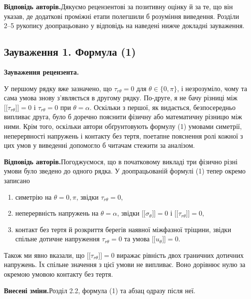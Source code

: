 \documentclass[11pt]{article}
\newcommand{\llbracket}{\mathopen{[\![}}
\newcommand{\rrbracket}{\mathclose{]\!]}}
\newcommand{\responseheading}{\textbf{Відповідь авторів.}\enspace}
\newcommand{\revisionheading}{\textbf{Внесені зміни.}\enspace}
\newenvironment{reviewcomment}{\def\FrameCommand{\textcolor{blue!45!black}{\vrule width 1.2pt}\hspace{9pt}}\MakeFramed{\advance\hsize-\width\FrameRestore}\noindent\textbf{Зауваження рецензента.}\par\smallskip\noindent}{\endMakeFramed}
\begin{document}
\responseheading Дякуємо рецензентові за позитивну оцінку й за те, що він указав, де додаткові проміжні етапи полегшили б розуміння виведення. Розділи 2–5 рукопису доопрацьовано у відповідь на наведені нижче докладні зауваження.

\subsection*{Зауваження 1. Формула (1)}

\begin{reviewcomment}
У першому рядку вже зазначено, що \(\tau_{r\theta}=0\) для \(\theta\in\{0,\pi\}\), і незрозуміло, чому та сама умова знову з’являється в другому рядку. По-друге, я не бачу різниці між \(\llbracket\tau_{r\theta}\rrbracket=0\) і \(\tau_{r\theta}=0\) при \(\theta=\alpha\). Оскільки з першої, як видається, безпосередньо випливає друга, було б доречно пояснити фізичну або математичну різницю між ними. Крім того, оскільки автори обґрунтовують формулу (1) умовами симетрії, неперервності напружень і контакту без тертя, поетапне пояснення ролі кожної з цих умов у виведенні допомогло б читачам стежити за аналізом.
\end{reviewcomment}

\responseheading Погоджуємося, що в початковому викладі три фізично різні умови було зведено до одного рядка. У доопрацьованій формулі (1) тепер окремо записано

\begin{enumerate}
\item симетрію на \(\theta=0,\pi\), звідки \(\tau_{r\theta}=0\),
\item неперервність напружень на \(\theta=\alpha\), звідки \(\llbracket\sigma_\theta\rrbracket=0\) і \(\llbracket\tau_{r\theta}\rrbracket=0\),
\item контакт без тертя й розкриття берегів наявної міжфазної тріщини, звідки спільне дотичне напруження \(\tau_{r\theta}=0\) та умова \(\llbracket u_\theta\rrbracket=0\).
\end{enumerate}

Також ми явно вказали, що \(\llbracket\tau_{r\theta}\rrbracket=0\) виражає рівність двох граничних дотичних напружень. Їх спільне значення з цієї умови не випливає. Воно дорівнює нулю за окремою умовою контакту без тертя.

\revisionheading Розділ 2.2, формула (1) та абзац одразу після неї.
\end{document}

